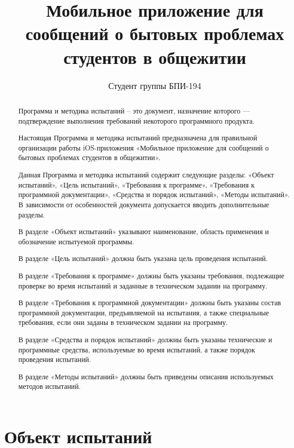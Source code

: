 \documentclass{../includes/TechDoc}
\title{Мобильное приложение для сообщений о бытовых проблемах студентов в общежитии}
\author{Студент группы БПИ-194}{В. А. Анненков}
\begin{document}
    \maketitle

    \begin{abstract}
        Программа и методика испытаний – это документ, назначение которого — подтверждение выполнения требований некоторого программного продукта.

        Настоящая Программа и методика испытаний предназначена для правильной организации работы iOS-приложения «Мобильное приложение для сообщений о бытовых проблемах студентов в общежитии».

        Данная Программа и методика испытаний содержит следующие разделы: «Объект испытаний», «Цель испытаний», «Требования к программе», «Требования к программной документации», «Средства и порядок испытаний», «Методы испытаний». В зависимости от особенностей документа допускается вводить дополнительные разделы.

        В разделе «Объект испытаний» указывают наименование, область применения и обозначение испытуемой программы.

        В разделе «Цель испытаний» должна быть указана цель проведения испытаний.

        В разделе «Требования к программе» должны быть указаны требования, подлежащие проверке во время испытаний и заданные в техническом задании на программу.

        В разделе «Требования к программной документации» должны быть указаны состав программной документации, предъявляемой на испытания, а также специальные требования, если они заданы в техническом задании на программу.

        В разделе «Средства и порядок испытаний» должны быть указаны технические и программные средства, используемые во время испытаний, а также порядок проведения испытаний.

        В разделе «Методы испытаний» должны быть приведены описания используемых методов испытаний.

    \end{abstract}

    \newpage

    \tableofcontents


    \section{Объект испытаний}
\end{document}
